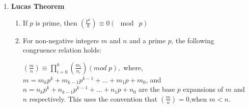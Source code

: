 \begin{enumerate}
            
            \item \textbf{Lucas Theorem}
                \begin{enumerate}

                    \item If $\displaystyle p$ is prime, then $\displaystyle \left(\frac{p^{a}}{k}\right) \equiv 0 (\mod\;
                        p)$
                    
                    \item 
                        For non-negative integers $m$ and $n$ and a prime $\displaystyle p$, the following congruence
                            relation holds:

                        \(\displaystyle \left(\frac{m}{n}\right) \equiv \prod_{i=0}^{k}
                            \left(\frac{m_{i}}{n_{i}}\right)
                            (mod\; p),\)
                            where,
                            $m=m_{k} p^{k} +m_{k-1} p^{k-1}+…+m_{1} p+m_{0}$,
                            and 
                            $n=n_{k}p^{k}+n_{k-1}p^{k-1}+…+n_{1}p+n_{0}$
                            are the base $\displaystyle p$ expansions of $m$ and $n$ respectively. This uses the
                            convention
                            that
                            $\displaystyle \left(\frac{m}{n}\right)=0$,when $m<n$.

                    
                \end{enumerate}


\end{enumerate}
